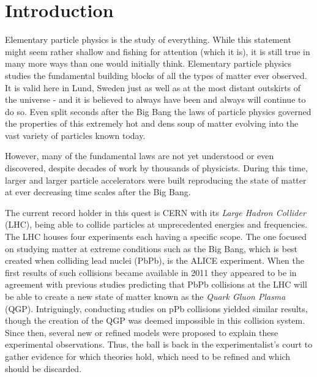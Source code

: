 \chapter{Introduction}
\label{sec:intro}

Elementary particle physics is the study of everything. While this statement might seem rather shallow and fishing for attention (which it is), it is still true in many more ways than one would initially think. Elementary particle physics studies the fundamental building blocks of all the types of matter ever observed. It is valid here in Lund, Sweden just as well as at the most distant outskirts of the universe - and it is believed to always have been and always will continue to do so. Even split seconds after the Big Bang the laws of particle physics governed the properties of this extremely hot and dens soup of matter evolving into the vast variety of particles known today.

However, many of the fundamental laws are not yet understood or even discovered, despite decades of work by thousands of physicists. During this time, larger and larger particle accelerators were built reproducing the state of matter at ever decreasing time scales after the Big Bang. 

The current record holder in this quest is CERN with its \emph{Large Hadron Collider} (LHC), being able to collide particles at unprecedented energies and frequencies. The LHC houses four experiments each having a specific scope. The one focused on studying matter at extreme conditions such as the Big Bang, which is best created when colliding lead nuclei (PbPb), is the ALICE experiment. When the first results of such collisions became available in 2011 they appeared  to be in agreement with previous studies predicting that PbPb collisions at the LHC will be able to create a new state of matter known as the \emph{Quark Gluon Plasma} (QGP).
Intriguingly, conducting studies on pPb collisions yielded similar results, though the creation of the QGP was deemed impossible in this collision system.
Since then, several new or refined models were proposed to explain these experimental observations.
Thus, the ball is back in the experimentalist's court to gather evidence for which theories hold, which need to be refined and which should be discarded.

